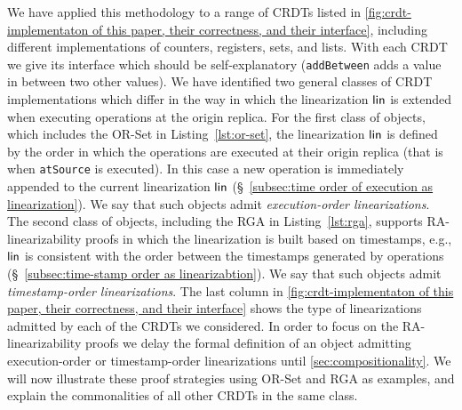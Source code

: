 We have applied this methodology to a range of CRDTs listed in \autoref{fig:crdt-implementaton of this paper, their correctness, and their interface},
including different implementations of counters, registers, sets, and lists. With each CRDT we give its interface which should be self-explanatory
({\tt addBetween} adds a value in between two other values).
We have identified two general classes of
CRDT implementations which differ in the way in which the
linearization $\mathsf{lin}$ is extended when executing operations at
the origin replica.
For the first class of objects, which includes the OR-Set in
Listing~\ref{lst:or-set}, the linearization $\mathsf{lin}$ is defined by
the order in which the operations are executed at their origin replica (that is
when \lstinline|atSource| is executed).
In this case a new operation is immediately appended
to the current linearization $\mathsf{lin}$ (\S~\ref{subsec:time order of execution
  as linearization}).
We say that such objects admit \emph{execution-order linearizations}.
The second class of objects, including the RGA in
Listing~\ref{lst:rga}, supports RA-linearizability proofs in which the
linearization is built based on timestamps, e.g., $\mathsf{lin}$ is
consistent with the order between the timestamps generated by
operations (\S~\ref{subsec:time-stamp order as linearizabtion}).
We say that such objects admit \emph{timestamp-order linearizations}.
The last column in \autoref{fig:crdt-implementaton of this paper, their correctness, and their interface}
shows the type of linearizations admitted by each of the CRDTs we considered. 
In order to focus on the RA-linearizability proofs we delay the formal definition 
of an object admitting execution-order or timestamp-order linearizations until \autoref{sec:compositionality}.
We will now illustrate these proof strategies using OR-Set and RGA as examples,
%
and explain the commonalities of all other CRDTs in
the same class.

